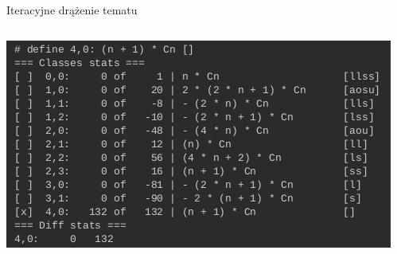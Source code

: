 \documentclass[final]{beamer}
\theoremstyle{bluetheorem}
\theoremstyle{bluetheorem}
\theoremstyle{greentheorem}
\begin{document}
\begin{frame}{Iteracyjne drążenie tematu}
\begin{columns}
\begin{block}{}
\begin{center}
                \includegraphics[width=\textwidth]{framework_003.png}
            \end{center}
        \end{block}
    \end{columns}
\end{frame}
\end{document}
